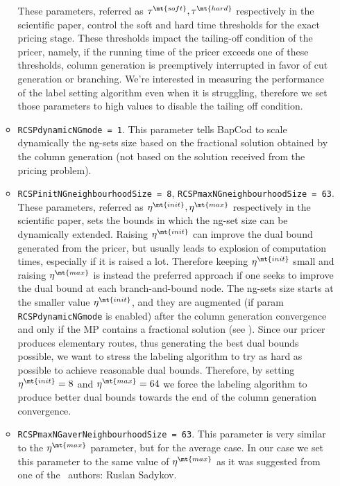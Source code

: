 \begin{itemize}
\begin{itemize}
		            These parameters, referred as $\tau^\mt{soft}, \tau^\mt{hard}$ respectively in the scientific paper,
		            control the soft and hard time thresholds for the exact pricing stage.
		            These thresholds impact the tailing-off condition of the pricer, namely, if the running time of the pricer exceeds one of these thresholds, column generation is preemptively interrupted in favor of cut generation or branching.
		            We're interested in measuring the performance of the label setting algorithm even when it is struggling, therefore we set those parameters to high values to disable the tailing off condition.
		      \item \texttt{RCSPdynamicNGmode = 1}.
		            This parameter tells BapCod to scale dynamically
		            the ng-sets size based on the
		            fractional solution obtained by the column generation
		            (not based on the solution received from the pricing problem).
		      \item \texttt{RCSPinitNGneighbourhoodSize = 8}, \texttt{RCSPmaxNGneighbourhoodSize = 63}.
		            These parameters, referred as $\eta^\mt{init}, \eta^\mt{max}$ respectively in the scientific paper,
		            sets the bounds in which the ng-set size can be dynamically extended.
		            Raising $\eta^\mt{init}$ can improve the dual bound generated from the pricer, but usually leads to explosion of computation times, especially if it is raised a lot.
		            Therefore keeping $\eta^\mt{init}$ small and raising $\eta^\mt{max}$ is instead the preferred approach if one seeks to improve the dual bound at each branch-and-bound node.
		            The ng-sets size starts at the smaller value $\eta^\mt{init}$, and they are augmented (if param \texttt{RCSPdynamicNGmode} is enabled)
		            after the column generation convergence and only if the MP contains a fractional solution (see \cite{pessoa2020a}).
		            Since our pricer produces elementary routes, thus generating the best dual bounds possible, we want to stress the labeling algorithm to try as hard as possible to achieve
		            reasonable dual bounds. Therefore, by setting $\eta^\mt{init} = 8$ and $\eta^\mt{max} = 64$ we force the labeling algorithm to produce better dual bounds towards the end
		            of the column generation convergence.
		      \item \texttt{RCSPmaxNGaverNeighbourhoodSize = 63}.
		            This parameter is very similar to the $\eta^\mt{max}$ parameter, but for the average case.
		            In our case we set this parameter to the same value of $\eta^\mt{max}$ as it was suggested from one of the \bapcod\ authors: Ruslan Sadykov.

\end{itemize}
\end{itemize}
